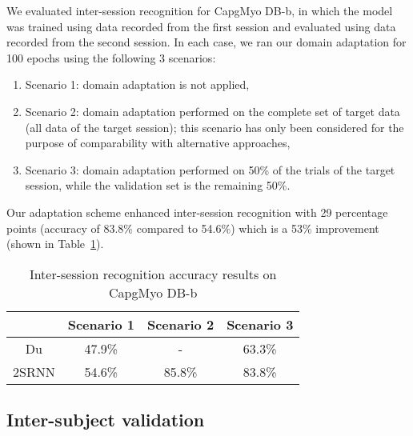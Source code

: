 \documentclass[conference]{IEEEtran}
\begin{document}
{\begin{minipage}{\textwidth}
We evaluated inter-session recognition for CapgMyo DB-b,
in which the model was trained using data recorded from the first session and evaluated using data recorded from the second session.
In each case, we ran our domain adaptation for 100 epochs using the following 3 scenarios:
\begin{enumerate}
	\item Scenario 1: domain adaptation is not applied,
	\item Scenario 2: domain adaptation performed on the complete set of target data (all data of the target session); this scenario has only been considered for the purpose of comparability with alternative approaches,
	\item Scenario 3: domain adaptation performed on 50\% of the trials of the target session, while the validation set is the remaining 50\%.
\end{enumerate}
Our adaptation scheme enhanced inter-session recognition with 29 percentage points (accuracy of 83.8\% compared to 54.6\%) which is a 53\% improvement (shown in Table~\ref{table:inter-session}). 

\begin{table}[tpb]
	\centering
	\begin{threeparttable}
		\def\arraystretch{1.5}\begin{tabular}{|c|c|c|c|} 
			\hline
			& Scenario 1 & Scenario 2 & Scenario 3 \\
			\hline
			Du\cite{b18} & 47.9\% & - & 63.3\% \\
			2SRNN & 54.6\% & 85.8\% & 83.8\% \\
			\hline
		\end{tabular}
		\caption{Inter-session recognition accuracy results on CapgMyo DB-b}
		\label{table:inter-session}
	\end{threeparttable}
\end{table}

\subsection{Inter-subject validation}


\end{minipage}}
\end{document}
